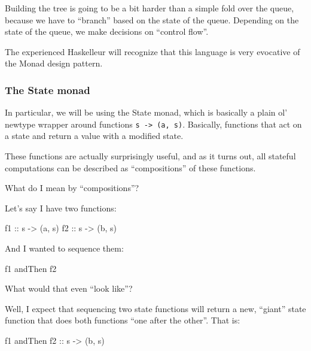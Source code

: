 \documentclass[]{article}
\newenvironment{Shaded}{}{}
\newcommand{\NormalTok}[1]{#1}
\newcommand{\OtherTok}[1]{\textcolor[rgb]{0.00,0.44,0.13}{#1}}
\begin{document}
Building the tree is going to be a bit harder than a simple fold over the queue,
because we have to ``branch'' based on the state of the queue. Depending on the
state of the queue, we make decisions on ``control flow''.

The experienced Haskelleur will recognize that this language is very evocative
of the Monad design pattern.

\subsubsection{The State monad}\label{the-state-monad}

In particular, we will be using the State monad, which is basically a plain ol'
newtype wrapper around functions \texttt{s\ -\textgreater{}\ (a,\ s)}.
Basically, functions that act on a state and return a value with a modified
state.

These functions are actually surprisingly useful, and as it turns out, all
stateful computations can be described as ``compositions'' of these functions.

What do I mean by ``compositions''?

Let's say I have two functions:

\begin{Shaded}
\begin{Highlighting}[]
\OtherTok{f1 ::}\NormalTok{ s }\OtherTok{{-}\textgreater{}}\NormalTok{ (a, s)}
\OtherTok{f2 ::}\NormalTok{ s }\OtherTok{{-}\textgreater{}}\NormalTok{ (b, s)}
\end{Highlighting}
\end{Shaded}

And I wanted to sequence them:

\begin{Shaded}
\begin{Highlighting}[]
\NormalTok{f1 }\OtherTok{\textasciigrave{}andThen\textasciigrave{}}\NormalTok{ f2}
\end{Highlighting}
\end{Shaded}

What would that even ``look like''?

Well, I expect that sequencing two state functions will return a new, ``giant''
state function that does both functions ``one after the other''. That is:

\begin{Shaded}
\begin{Highlighting}[]
\NormalTok{f1 }\OtherTok{\textasciigrave{}andThen\textasciigrave{} f2 ::}\NormalTok{ s }\OtherTok{{-}\textgreater{}}\NormalTok{ (b, s)}
\end{Highlighting}
\end{Shaded}
\end{document}
